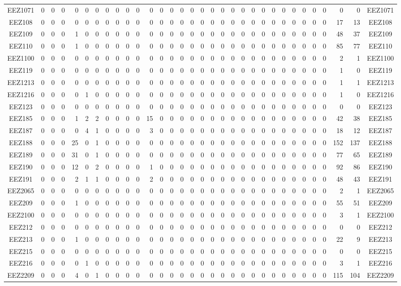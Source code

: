 \documentclass[10pt,a4paper,twoside]{report}
\begin{document}
{\begin{tabular}{crrrrrrrrrrrrrrrrrrrrrrrrrrrrrrc}
EEZ1071&0&0&0&0&0&0&0&0&0&0&0&0&0&0&0&0&0&0&0&0&0&0&0&0&0&0&0&0&0&0&EEZ1071\\
EEZ108&0&0&0&0&0&0&0&0&0&0&0&0&0&0&0&0&0&0&0&0&0&0&0&0&0&0&0&0&17&13&EEZ108\\
EEZ109&0&0&0&1&0&0&0&0&0&0&0&0&0&0&0&0&0&0&0&0&0&0&0&0&0&0&0&0&48&37&EEZ109\\
EEZ110&0&0&0&1&0&0&0&0&0&0&0&0&0&0&0&0&0&0&0&0&0&0&0&0&0&0&0&0&85&77&EEZ110\\
EEZ1100&0&0&0&0&0&0&0&0&0&0&0&0&0&0&0&0&0&0&0&0&0&0&0&0&0&0&0&0&2&1&EEZ1100\\
EEZ119&0&0&0&0&0&0&0&0&0&0&0&0&0&0&0&0&0&0&0&0&0&0&0&0&0&0&0&0&1&0&EEZ119\\
EEZ1213&0&0&0&0&0&0&0&0&0&0&0&0&0&0&0&0&0&0&0&0&0&0&0&0&0&0&0&0&1&1&EEZ1213\\
EEZ1216&0&0&0&0&1&0&0&0&0&0&0&0&0&0&0&0&0&0&0&0&0&0&0&0&0&0&0&0&1&0&EEZ1216\\
EEZ123&0&0&0&0&0&0&0&0&0&0&0&0&0&0&0&0&0&0&0&0&0&0&0&0&0&0&0&0&0&0&EEZ123\\
EEZ185&0&0&0&1&2&2&0&0&0&0&15&0&0&0&0&0&0&0&0&0&0&0&0&0&0&0&0&0&42&38&EEZ185\\
EEZ187&0&0&0&0&4&1&0&0&0&0&3&0&0&0&0&0&0&0&0&0&0&0&0&0&0&0&0&0&18&12&EEZ187\\
EEZ188&0&0&0&25&0&1&0&0&0&0&0&0&0&0&0&0&0&0&0&0&0&0&0&0&0&0&0&0&152&137&EEZ188\\
EEZ189&0&0&0&31&0&1&0&0&0&0&0&0&0&0&0&0&0&0&0&0&0&0&0&0&0&0&0&0&77&65&EEZ189\\
EEZ190&0&0&0&12&0&2&0&0&0&0&1&0&0&0&0&0&0&0&0&0&0&0&0&0&0&0&0&0&92&86&EEZ190\\
EEZ191&0&0&0&2&1&1&0&0&0&0&2&0&0&0&0&0&0&0&0&0&0&0&0&0&0&0&0&0&48&43&EEZ191\\
EEZ2065&0&0&0&0&0&0&0&0&0&0&0&0&0&0&0&0&0&0&0&0&0&0&0&0&0&0&0&0&2&1&EEZ2065\\
EEZ209&0&0&0&1&0&0&0&0&0&0&0&0&0&0&0&0&0&0&0&0&0&0&0&0&0&0&0&0&55&51&EEZ209\\
EEZ2100&0&0&0&0&0&0&0&0&0&0&0&0&0&0&0&0&0&0&0&0&0&0&0&0&0&0&0&0&3&1&EEZ2100\\
EEZ212&0&0&0&0&0&0&0&0&0&0&0&0&0&0&0&0&0&0&0&0&0&0&0&0&0&0&0&0&0&0&EEZ212\\
EEZ213&0&0&0&1&0&0&0&0&0&0&0&0&0&0&0&0&0&0&0&0&0&0&0&0&0&0&0&0&22&9&EEZ213\\
EEZ215&0&0&0&0&0&0&0&0&0&0&0&0&0&0&0&0&0&0&0&0&0&0&0&0&0&0&0&0&0&0&EEZ215\\
EEZ216&0&0&0&0&1&0&0&0&0&0&0&0&0&0&0&0&0&0&0&0&0&0&0&0&0&0&0&0&3&1&EEZ216\\
EEZ2209&0&0&0&4&0&1&0&0&0&0&0&0&0&0&0&0&0&0&0&0&0&0&0&0&0&0&0&0&115&104&EEZ2209\\

\end{tabular}}
\end{document}
